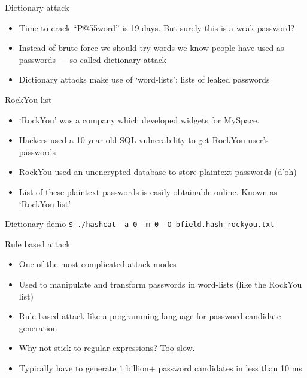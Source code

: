 \documentclass[12pt,aspectratio=169]{beamer}
\begin{document}
\begin{frame}{Dictionary attack}
	\begin{itemize}
       	  \item Time to crack ``P@55word'' is 19 days. But surely this is a weak password?
	    \item Instead of brute force we should try words we know people have used as passwords --- so called dictionary attack
            \item Dictionary attacks make use of `word-lists': lists of leaked passwords
	\end{itemize}
\end{frame}

\begin{frame}{RockYou list}
    \begin{itemize}
        \item `RockYou' was a company which developed widgets for MySpace.
        \item Hackers used a 10-year-old SQL vulnerability to get RockYou user's passwords
        \item RockYou used an unencrypted database to store plaintext passwords (d'oh)
        \item List of these plaintext passwords is easily obtainable online. Known as `RockYou list'
    \end{itemize}
\end{frame}

\begin{frame}{Dictionary demo}
    \lstinline|$ ./hashcat -a 0 -m 0 -O bfield.hash rockyou.txt|
\end{frame}

\begin{frame}{Rule based attack}
    \begin{itemize}
        \item One of the most complicated attack modes
	\item Used to manipulate and transform passwords in word-lists (like the RockYou list)
        \item Rule-based attack like a programming language for password candidate generation
	\vspace{0.5cm}
        \item Why not stick to regular expressions? Too slow.
        \item Typically have to generate $1$ billion$+$ password candidates in less than 10 ms
    \end{itemize}
\end{frame}
\end{document}
